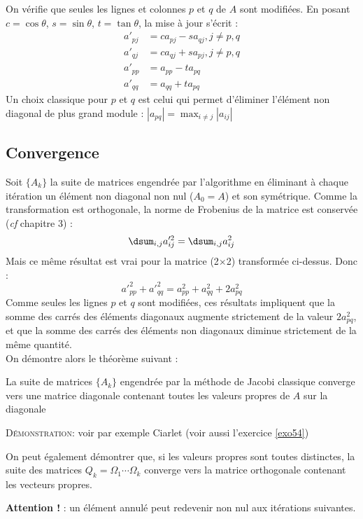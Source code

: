 On vérifie que seules les lignes et colonnes $p$ et $q$ de $A$ sont modifiées. 
En posant $c=\cos\theta$, $s=\sin\theta$, $t=\tan\theta$, la mise à jour s'écrit :
\begin{align*}
a'_{pj}&=ca_{pj}-sa_{qj},j\neq p,q\\
a'_{qj}&=ca_{qj}+sa_{pj},j\neq p,q\\
a'_{pp}&=a_{pp}-ta_{pq}\\
a'_{qq}&=a_{qq}+ta_{pq}
\end{align*}
Un choix classique pour $p$ et $q$ est celui qui permet d'éliminer l'élément non diagonal de plus grand module : $|a_{pq}|=\displaystyle\max_{i\neq j}|a_{ij}|$

\subsection{Convergence}
Soit $\{A_k\}$ la suite de matrices engendrée par l'algorithme en éliminant à chaque itération un élément non diagonal non nul ($A_0=A$) et son symétrique. Comme la transformation est orthogonale, la norme de Frobenius de la matrice est conservée ({\it cf} chapitre 3) : 
$$
\dsum_{i,j}a_{ij}'^2=\dsum_{i,j}a_{ij}^2
$$
Mais ce même résultat est vrai pour la matrice (2$\times$2) transformée ci-dessus. Donc :
$$a'^2_{pp}+a'^2_{qq}=a^2_{pp}+a^2_{qq}+2a_{pq}^2$$
Comme seules les lignes $p$ et $q$ sont modifiées, ces résultats impliquent que la somme des carrés des éléments diagonaux augmente strictement de la valeur $2a_{pq}^2$, et que la somme des carrés des éléments non diagonaux diminue strictement de la même quantité.\\
On démontre alors le théorème suivant :
\begin{theo}
La suite de matrices $\{A_k\}$ engendrée par la méthode de Jacobi classique converge vers une matrice diagonale contenant toutes les valeurs propres de $A$ sur la diagonale
\end{theo}
\textsc{Démonstration:} voir par exemple Ciarlet \cite{CPG:82} (voir aussi l'exercice \ref{exo54})


On peut également démontrer que, si les valeurs propres sont toutes distinctes, la suite des matrices $Q_k=\Omega_1\cdots \Omega_k$ converge vers la matrice orthogonale contenant les vecteurs propres.

\textbf{Attention !} : un élément annulé peut redevenir non nul aux itérations suivantes.


